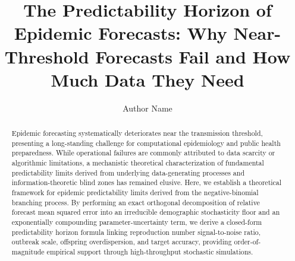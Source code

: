 \documentclass[review]{elsarticle}
\theoremstyle{plain}
\theoremstyle{definition}
\begin{document}
\begin{frontmatter}

\title{The Predictability Horizon of Epidemic Forecasts: Why Near-Threshold Forecasts Fail and How Much Data They Need}

\author[inst1]{Author Name}


\begin{abstract}
Epidemic forecasting systematically deteriorates near the transmission threshold, presenting a long-standing challenge for computational epidemiology and public health preparedness. While operational failures are commonly attributed to data scarcity or algorithmic limitations, a mechanistic theoretical characterization of fundamental predictability limits derived from underlying data-generating processes and information-theoretic blind zones has remained elusive. Here, we establish a theoretical framework for epidemic predictability limits derived from the negative-binomial branching process. By performing an exact orthogonal decomposition of relative forecast mean squared error into an irreducible demographic stochasticity floor and an exponentially compounding parameter-uncertainty term, we derive a closed-form predictability horizon formula linking reproduction number signal-to-noise ratio, outbreak scale, offspring overdispersion, and target accuracy, providing order-of-magnitude empirical support through high-throughput stochastic simulations.


\end{abstract}
\end{frontmatter}
\end{document}
